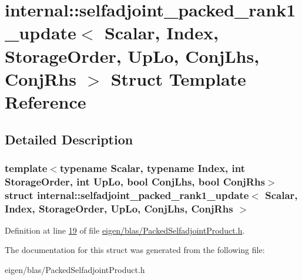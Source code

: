 \hypertarget{structinternal_1_1selfadjoint__packed__rank1__update}{}\section{internal\+:\+:selfadjoint\+\_\+packed\+\_\+rank1\+\_\+update$<$ Scalar, Index, Storage\+Order, Up\+Lo, Conj\+Lhs, Conj\+Rhs $>$ Struct Template Reference}
\label{structinternal_1_1selfadjoint__packed__rank1__update}


\subsection{Detailed Description}
\subsubsection*{template$<$typename Scalar, typename Index, int Storage\+Order, int Up\+Lo, bool Conj\+Lhs, bool Conj\+Rhs$>$\newline
struct internal\+::selfadjoint\+\_\+packed\+\_\+rank1\+\_\+update$<$ Scalar, Index, Storage\+Order, Up\+Lo, Conj\+Lhs, Conj\+Rhs $>$}



Definition at line \hyperlink{eigen_2blas_2_packed_selfadjoint_product_8h_source_l00019}{19} of file \hyperlink{eigen_2blas_2_packed_selfadjoint_product_8h_source}{eigen/blas/\+Packed\+Selfadjoint\+Product.\+h}.



The documentation for this struct was generated from the following file\+:\begin{DoxyCompactItemize}
\item 
eigen/blas/\+Packed\+Selfadjoint\+Product.\+h\end{DoxyCompactItemize}

